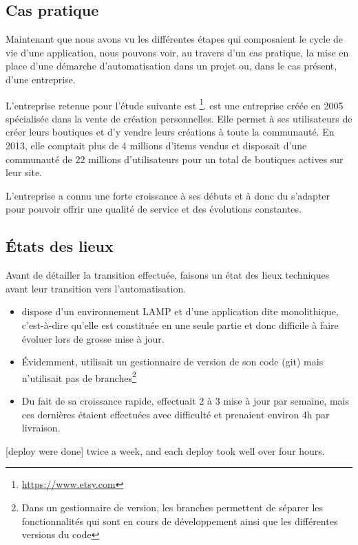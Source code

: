 \subsection{Cas pratique}

Maintenant que nous avons vu les différentes étapes qui composaient le cycle de vie d'une application, nous pouvons voir, au travers d'un cas pratique, la mise en place d'une démarche d'automatisation dans un projet ou, dans le cas présent, d'une entreprise.

L'entreprise retenue pour l'étude suivante est \etsy\footnote{\url{https://www.etsy.com}}. \etsy{} est une entreprise créée en 2005 spécialisée dans la vente de création personnelles. Elle permet à ses utilisateurs de créer leurs boutiques et d'y vendre leurs créations à toute la communauté. En 2013, elle comptait plus de 4 millions d'items vendus et disposait d'une communauté de 22 millions d'utilisateurs pour un total de  boutiques actives sur leur site.

L'entreprise a connu une forte croissance à ses débuts et à donc du s'adapter pour pouvoir offrir une qualité de service et des évolutions constantes.

\subsection{États des lieux}

Avant de détailler la transition effectuée, faisons un état des lieux techniques avant leur transition vers l'automatisation.

\begin{itemize}
	\item \etsy{} dispose d'un environnement \gls{LAMP} et d'une application dite monolithique, c'est-à-dire qu'elle est constituée en une seule partie et donc difficile à faire évoluer lors de grosse mise à jour.
	\item Évidemment, \etsy{} utilisait un gestionnaire de version de son code (\gls{git}) mais n'utilisait pas de branches\footnote{Dans un gestionnaire de version, les branches permettent de séparer les fonctionnalités qui sont en cours de développement ainsi que les différentes versions du code}
	\item Du fait de sa croissance rapide, \etsy{} effectuait 2 à 3 mise à jour par semaine, mais ces dernières étaient effectuées avec difficulté et prenaient environ 4h par livraison. 
\end{itemize}

\epigraph{[deploy were done] twice a week, and each deploy took well over four hours.}{ \cite{etsyInterview}}

